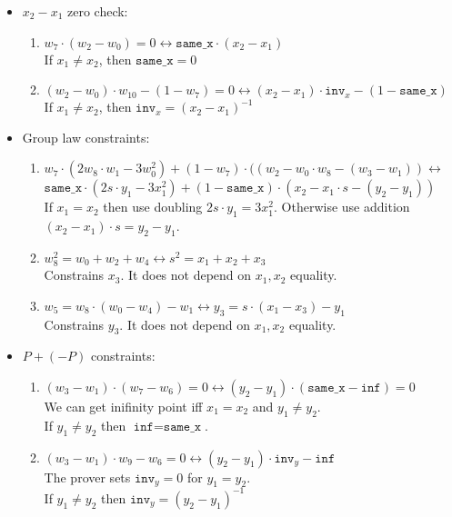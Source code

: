 \begin{itemize}
	 \item $x_2 - x_1$ zero check:
	 \begin{enumerate}
		 	\item $w_7 \cdot (w_2 - w_0) = 0 \longleftrightarrow 
		 			\texttt{same\_x} \cdot (x_2 -x_1)$ \\
		 		If $x_1 \neq x_2$, then $\texttt{same\_x} = 0$
		    \item $(w_2 - w_0) \cdot w_{10} - (1 - w_7) = 0 \longleftrightarrow 
		    		(x_2 - x_1) \cdot \texttt{inv}_x - (1 - \texttt{same\_x})$ \\
		    	If $x_1 \neq x_2$, then $\texttt{inv}_x = (x_2 - x_1)^{-1}$
	 \end{enumerate}
	 \item Group law constraints:
	 \begin{enumerate}
	 	\item $w_7 \cdot (2w_8 \cdot w_1 - 3w_0^2) + (1 - w_7) \cdot ((w_2 - w_0 \cdot w_8 - (w_3 - w_1)) \longleftrightarrow$ \\
			  $\texttt{same\_x} \cdot (2s \cdot y_1 - 3x_1^2) + (1 - \texttt{same\_x}) \cdot (x_2 - x_1 \cdot s - (y_2 - y_1))$ \\
			If $x_1 = x_2$ then use doubling $2s \cdot y_1 = 3x_1^2$. Otherwise use addition $(x_2 - x_1) \cdot s = y_2 - y_1$.
	 	\item $w_8^2 = w_0 + w_2 + w_4 \longleftrightarrow 
	 			s^2 = x_1 + x_2 + x_3$ \\
	 		Constrains $x_3$. It does not depend on $x_1, x_2$ equality.
	 	\item $w_5 = w_8 \cdot (w_0 - w_4) - w_1 \longleftrightarrow 
	 			y_3 = s \cdot (x_1 - x_3) - y_1$ \\
	 		Constrains $y_3$. It does not depend on $x_1, x_2$ equality.
	 \end{enumerate}
	 \item $P + (-P)$ constraints:
	 \begin{enumerate}
		 \item $(w_3 - w_1) \cdot (w_7 - w_6) = 0 \longleftrightarrow 
	    			(y_2 - y_1) \cdot (\texttt{same\_x} - \texttt{inf}) = 0$ \\ 
	    	We can get inifinity point iff $x_1 = x_2$ and $y_1 \neq y_2$. \\
	    	If $y_1 \neq y_2$ then $\texttt{inf} = \texttt{same\_x}$.
	    \item $(w_3 - w_1) \cdot w_9 - w_6 = 0 \longleftrightarrow 
	    			(y_2 - y_1) \cdot \texttt{inv}_y - \texttt{inf}$ \\
	    	The prover sets $\texttt{inv}_y = 0$ for $y_1 = y_2$. \\
	    	If $y_1 \neq y_2$ then $\texttt{inv}_y = (y_2 - y_1)^{-1}$
	 \end{enumerate}
\end{itemize}

